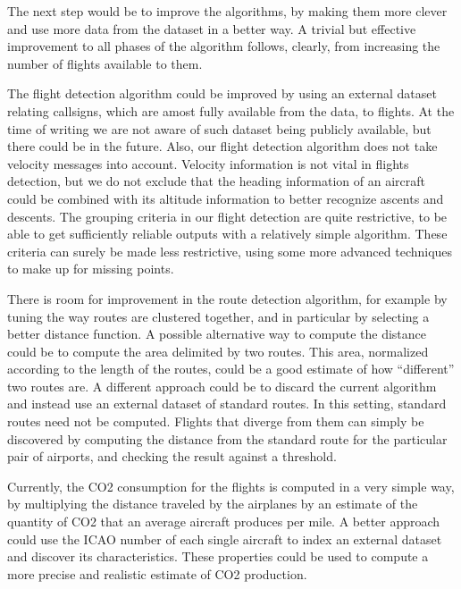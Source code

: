 \documentclass{vldb}
\begin{document}
The next step would be to improve the algorithms, by making them more clever and
use more data from the dataset in a better way. A trivial but effective
improvement to all phases of the algorithm follows, clearly, from increasing
the number of flights available to them.

The flight detection algorithm could be improved by using an external dataset
relating callsigns, which are amost fully available from the data, to flights.
At the time of writing we are not aware of such dataset being publicly
available, but there could be in the future. Also, our flight detection
algorithm does not take velocity messages into account. Velocity information is
not vital in flights detection, but we do not exclude that the heading
information of an aircraft could be combined with its altitude information to
better recognize ascents and descents. The grouping criteria in our flight
detection are quite restrictive, to be able to get sufficiently reliable outputs
with a relatively simple algorithm. These criteria can surely be made less
restrictive, using some more advanced techniques to make up for missing points.

There is room for improvement in the route detection algorithm, for example
by tuning the way routes are clustered together, and in particular by selecting
a better distance function.
A possible alternative way to compute the distance could be to compute the area
delimited by two routes. This area, normalized according to the length of the
routes, could be a good estimate of how ``different'' two routes are.
A different approach could be to discard the current algorithm and instead use
an external dataset of standard routes. In this setting, standard routes need
not be computed. Flights that diverge from them can simply be discovered by
computing the distance from the standard route for the particular pair of
airports, and checking the result against a threshold.

Currently, the CO2 consumption for the flights is computed in a very simple way,
by multiplying the distance traveled by the airplanes by an estimate of the
quantity of CO2 that an average aircraft produces per mile. A better approach
could use the ICAO number of each single aircraft to index an external dataset
and discover its characteristics. These properties could be used to compute a
more precise and realistic estimate of CO2 production.

\end{document}
